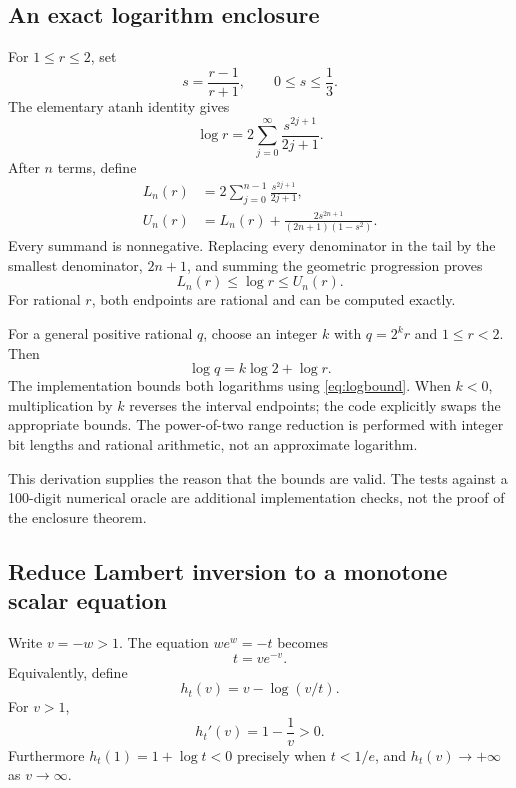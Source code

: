 \documentclass[11pt,a4paper]{article}
\begin{document}
\subsection{An exact logarithm enclosure}
For $1\le r\le2$, set
\begin{equation}
 s=\frac{r-1}{r+1},\qquad 0\le s\le\frac13.
\end{equation}
The elementary atanh identity gives
\begin{equation}
 \log r=2\sum_{j=0}^{\infty}\frac{s^{2j+1}}{2j+1}.
\end{equation}
After $n$ terms, define
\begin{align}
 L_n(r)&=2\sum_{j=0}^{n-1}\frac{s^{2j+1}}{2j+1},\\
 U_n(r)&=L_n(r)+\frac{2s^{2n+1}}{(2n+1)(1-s^2)}.
 \label{eq:logbound}
\end{align}
Every summand is nonnegative. Replacing every denominator in the tail by the smallest denominator, $2n+1$, and summing the geometric progression proves
\begin{equation}
 L_n(r)\le\log r\le U_n(r).
\end{equation}
For rational $r$, both endpoints are rational and can be computed exactly.

For a general positive rational $q$, choose an integer $k$ with $q=2^k r$ and $1\le r<2$. Then
\begin{equation}
 \log q=k\log2+\log r.
\end{equation}
The implementation bounds both logarithms using \eqref{eq:logbound}. When $k<0$, multiplication by $k$ reverses the interval endpoints; the code explicitly swaps the appropriate bounds. The power-of-two range reduction is performed with integer bit lengths and rational arithmetic, not an approximate logarithm.

This derivation supplies the reason that the bounds are valid. The tests against a 100-digit numerical oracle are additional implementation checks, not the proof of the enclosure theorem.

\subsection{Reduce Lambert inversion to a monotone scalar equation}
Write $v=-w>1$. The equation $w e^w=-t$ becomes
\begin{equation}
 t=v e^{-v}.
\end{equation}
Equivalently, define
\begin{equation}
 h_t(v)=v-\log(v/t).
\end{equation}
For $v>1$,
\begin{equation}
 h_t'(v)=1-\frac1v>0.
\end{equation}
Furthermore $h_t(1)=1+\log t<0$ precisely when $t<1/e$, and $h_t(v)\to+\infty$ as $v\to\infty$.
\end{document}
